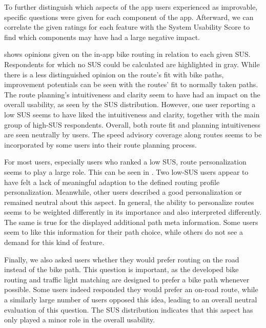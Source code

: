 To further distinguish which aspects of the app users experienced as improvable, specific questions were given for each component of the app. Afterward, we can correlate the given ratings for each feature with the System Usability Score to find which components may have had a large negative impact.

 shows opinions given on the in-app bike routing in relation to each given SUS. Respondents for which no SUS could be calculated are highlighted in gray. While there is a less distinguished opinion on the route's fit with bike paths, improvement potentials can be seen with the routes' fit to normally taken paths. The route planning's intuitiveness and clarity seem to have had an impact on the overall usability, as seen by the SUS distribution. However, one user reporting a low SUS seems to have liked the intuitiveness and clarity, together with the main group of high-SUS respondents. Overall, both route fit and planning intuitiveness are seen neutrally by users. The speed advisory coverage along routes seems to be incorporated by some users into their route planning process.

For most users, especially users who ranked a low SUS, route personalization seems to play a large role. This can be seen in . Two low-SUS users appear to have felt a lack of meaningful adaption to the defined routing profile personalization. Meanwhile, other users described a good personalization or remained neutral about this aspect. In general, the ability to personalize routes seems to be weighted differently in its importance and also interpreted differently. The same is true for the displayed additional path meta information. Some users seem to like this information for their path choice, while others do not see a demand for this kind of feature. 

Finally, we also asked users whether they would prefer routing on the road instead of the bike path. This question is important, as the developed bike routing and traffic light matching are designed to prefer a bike path whenever possible. Some users indeed responded they would prefer an on-road route, while a similarly large number of users opposed this idea, leading to an overall neutral evaluation of this question. The SUS distribution indicates that this aspect has only played a minor role in the overall usability.

